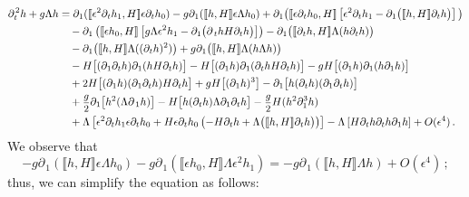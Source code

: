 \documentclass[11pt]{article}
\theoremstyle{plain}
\theoremstyle{definition}
\theoremstyle{definition}
\def\p{\text{\bf\emph{p}}}
\def\p{{\partial\hspace{1pt}}}
\def\comm#1#2{{\llbracket#1,#2\rrbracket}}
\def\smallexp#1{{\text{\small #1}}}
\def\dfrac#1#2{\smallexp{$\displaystyle{}\frac{#1}{#2}$}}
\begin{document}
\begin{align*}
\p_{\!t}^2 h + g\Lambda h &=\p_{\!1} (\comm{\epsilon^2\p_{\!t} h_1}{H} \epsilon\partial_t h_0) - g\p_{\!1} (\comm{h}{H} \epsilon\Lambda h_0) + \p_{\!1} \big(\comm{\epsilon\p_{\!t} h_0}{H} \left[\epsilon^2\partial_t h_1-\p_{\!1} \big(\comm{h}{H} \partial_t h\big)\right]\big) \\
&\quad - \p_{\!1} \left(\comm{\epsilon h_0}{H} \left[g \Lambda \epsilon^2 h_1 - \partial_1 \big(\p_t hH\partial_t h \big)\right]\right) - \p_{\!1} \big(\comm{\p_{\!t} h}{H} \Lambda (h \partial_t h)\big) \\
&\quad - \p_{\!1} \big(\comm{h}{H} \Lambda ((\p_{\!t} h)^2)\big) + g\p_{\!1} \big(\comm{h}{H} \Lambda (h \Lambda h)\big) \\
&\quad - H \big[(\p_{\!1} \p_{\!t} h) \p_{\!1}(h H\p_{\!t} h)\big] -  H \big[(\p_{\!1} h) \p_{\!1}(\p_{\!t} h H\p_{\!t} h)\big]
 - gH \big[(\p_{\!1} h) \p_{\!1}(h \partial_1 h)\big] \nonumber\\
&\quad + 2 H \big[(\p_{\!1}h) (\p_{\!1} \p_{\!t} h) H\p_{\!t} h\big] + gH \big[(\p_{\!1}h)^3\big] - \p_{\!1} \big[h (\p_{\!t} h) (\partial_1 \p_{\!t} h) \big] \\
&\quad + \dfrac{g}{2} \p_{\!1} \big[h^2 (\Lambda \p_{1} h)\big] - H \big[h (\p_{\!t} h)\Lambda \partial_1\p_{\!t} h\big] - \dfrac{g}{2} H (h^2 \partial_1^3h)\\
&\quad +\Lambda \left[\epsilon^2\partial_t h_{1}\epsilon \partial_t h_{0}  +H\epsilon\p_{\!t} h_0\left(-H\p_{\!t} h + \Lambda \big(\comm{h}{H}  \p_{\!t} h\big)\right)\right]- \Lambda \left[ H\p_{\!t} h \partial_t h \p_{\!1} h \right]+O(\epsilon^4)\,.
\end{align*}
We observe that
$$
- g\p_{\!1} (\comm{h}{H} \epsilon\Lambda h_0)-g\p_{\!1} \left(\comm{\epsilon h_0}{H} \Lambda \epsilon^2 h_1
\right)=-g\p_{\!1} \left(\comm{h}{H} \Lambda h\right)+O(\epsilon^4)\,;
$$
thus, we can simplify the equation as follows:
\end{document}
